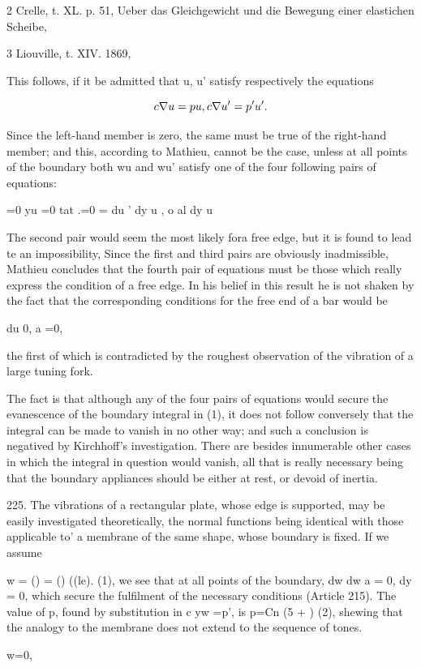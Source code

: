 2 Crelle, t. XL. p. 51, Ueber das Gleichgewicht und die Bewegung einer
elastichen Scheibe,

3 Liouville, t. XIV. 1869,

This follows, if it be admitted that u, u' satisfy respectively the
equations

\[c \nabla u = p u, c \nabla u' = p' u'.\]

Since the left-hand member is zero, the same must be true of the
right-hand member; and this, according to Mathieu, cannot be the case,
unless at all points of the boundary both wu and wu' satisfy one of the
four following pairs of equations:

=0 yu =0 tat .=0 = du ' dy u , o al dy u

The second pair would seem the most likely fora free edge, but it is
found to lead te an impossibility, Since the first and third pairs are
obviously inadmissible, Mathieu concludes that the fourth pair of
equations must be those which really express the condition of a free
edge. In his belief in this result he is not shaken by the fact that the
corresponding conditions for the free end of a bar would be

du 0, a =0,

the first of which is contradicted by the roughest observation of the
vibration of a large tuning fork.

The fact is that although any of the four pairs of equations would
secure the evanescence of the boundary integral in (1), it does not
follow conversely that the integral can be made to vanish in no other
way; and such a conclusion is negatived by Kirchhoff's investigation.
There are besides innumerable other cases in which the integral in
question would vanish, all that is really necessary being that the
boundary appliances should be either at rest, or devoid of inertia.

225. The vibrations of a rectangular plate, whose edge is
supported, may be easily investigated theoretically, the normal
functions being identical with those applicable to' a membrane of the
same shape, whose boundary is fixed. If we assume

w = () = () ((le). (1),
we see that at all points of the boundary, dw dw a = 0, dy = 0,
which secure the fulfilment of the necessary conditions (Article 215).
The value of p, found by substitution in c yw =p',
is p=Cn (5 + ) (2),
shewing that the analogy to the membrane does not extend to the sequence
of tones.

w=0,

